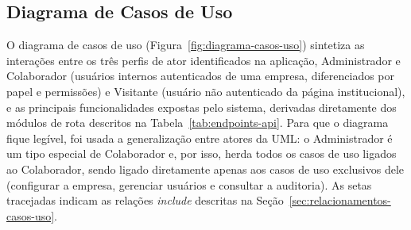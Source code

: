 \subsection{Diagrama de Casos de Uso}
\label{sec:diagrama-casos-uso}

O diagrama de casos de uso (Figura~\ref{fig:diagrama-casos-uso}) sintetiza as interações entre os três perfis de ator identificados na aplicação, Administrador e Colaborador (usuários internos autenticados de uma empresa, diferenciados por papel e permissões) e Visitante (usuário não autenticado da página institucional), e as principais funcionalidades expostas pelo sistema, derivadas diretamente dos módulos de rota descritos na Tabela~\ref{tab:endpoints-api}. Para que o diagrama fique legível, foi usada a generalização entre atores da UML: o Administrador é um tipo especial de Colaborador e, por isso, herda todos os casos de uso ligados ao Colaborador, sendo ligado diretamente apenas aos casos de uso exclusivos dele (configurar a empresa, gerenciar usuários e consultar a auditoria). As setas tracejadas indicam as relações \textit{\guillemotleft include\guillemotright} descritas na Seção~\ref{sec:relacionamentos-casos-uso}.

